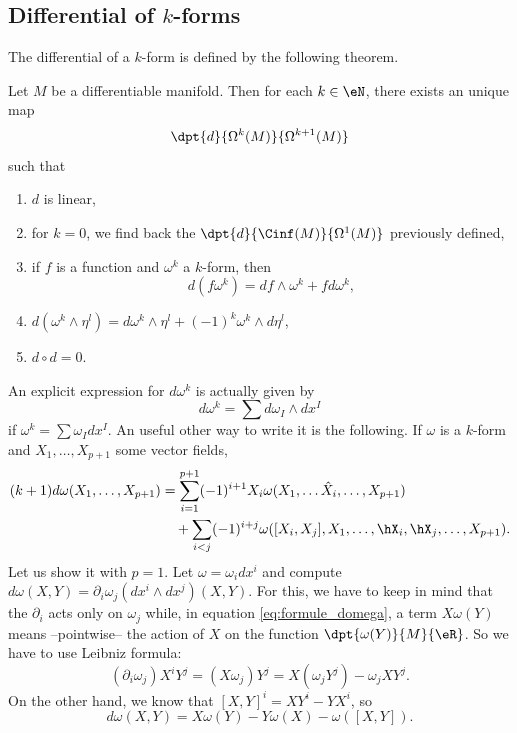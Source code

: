 \subsection{Differential of \texorpdfstring{$k$}{k}-forms}

The differential of a $k$-form is defined by the following theorem.

\begin{theorem}
	Let $M$ be a differentiable manifold. Then for each $k\in \eN$, there exists an unique map
	\[
		\dpt{d}{\Omega^k(M)}{\Omega^{k+1}(M)}
	\]
	such that

	\begin{enumerate}
		\item $d$ is linear,
		\item for $k=0$, we find back the $\dpt{d}{\Cinf(M)}{\Omega^1(M)}$ previously defined,
		\item if $f$ is a function and $\omega^k$ a $k$-form, then
		      \begin{equation}
			      d(f\omega^k)=df\wedge\omega^k+fd\omega^k,
		      \end{equation}


		\item $d(\omega^k\wedge\eta^l)=d\omega^k\wedge\eta^l+(-1)^k\omega^k\wedge d\eta^l$,
		\item $d\circ d=0$.
	\end{enumerate}
\end{theorem}

An explicit expression for $d\omega^k$ is actually given by
\begin{equation}
	d\omega^k=\sum d\omega_I\wedge dx^I
\end{equation}
if $\omega^k=\sum\omega_I dx^I$.
An useful other way to write it is the following. If $\omega$ is a $k$-form and $X_1,\ldots,X_{p+1}$ some vector fields,
\begin{equation}\label{eq:formule_domega}
	\begin{split}
		(k+1)d\omega(X_1,\ldots,X_{p+1}) & =\sum_{i=1}^{p+1}(-1)^{i+1}X_i\omega(X_1,\ldots\hat{X}_i,\ldots,X_{p+1})           \\
		                                 & \quad+\sum_{i<j}(-1)^{i+j}\omega([X_i,X_j],X_1,\ldots,\hX_i,\hX_j,\ldots,X_{p+1}).
	\end{split}
\end{equation}
Let us show it with $p=1$. Let $\omega=\omega_i dx^i$ and compute $d\omega(X,Y)=\partial_i\omega_j(dx^i\wedge dx^j)(X,Y)$. For this, we have to keep in mind that the $\partial_i$ acts only on $\omega_j$ while, in equation \eqref{eq:formule_domega}, a term $X\omega(Y)$ means --pointwise-- the action of $X$ on the function $\dpt{\omega(Y)}{M}{\eR}$. So we have to use Leibniz formula:
\[
	(\partial_i\omega_j)X^iY^j=(X\omega_j)Y^j
	=X(\omega_j Y^j)-\omega_j XY^j.
\]
On the other hand, we know that $[X,Y]^i=XY^i-YX^i$, so
\begin{equation}
	d\omega(X,Y)=X\omega(Y)-Y\omega(X)-\omega([X,Y]).
\end{equation}

